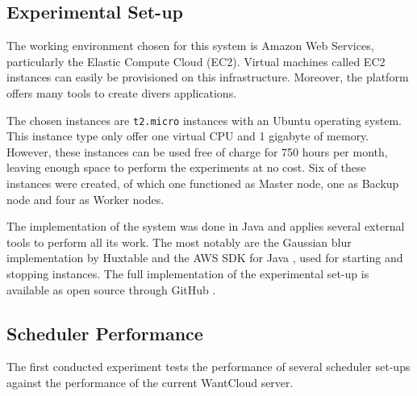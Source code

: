 \documentclass{acm_proc_article-sp}
\begin{document}
\subsection{Experimental Set-up}
The working environment chosen for this system is Amazon Web Services\cite{web:aws}, particularly the Elastic Compute Cloud (EC2)\cite{web:ec2}.
Virtual machines called EC2 instances can easily be provisioned on this infrastructure.
Moreover, the platform offers many tools to create divers applications.

The chosen instances are \texttt{t2.micro} instances with an Ubuntu operating system.
This instance type only offer one virtual CPU and 1 gigabyte of memory.
However, these instances can be used free of charge for 750 hours per month, leaving enough space to perform the experiments at no cost.
Six of these instances were created, of which one functioned as Master node, one as Backup node and four as Worker nodes.

The implementation of the system was done in Java and applies several external tools to perform all its work.
The most notably are the Gaussian blur implementation by Huxtable \cite{web:huxtable} and the AWS SDK for Java \cite{web:sdk}, used for starting and stopping instances.
The full implementation of the experimental set-up is available as open source through GitHub \cite{web:git}.

\subsection{Scheduler Performance}
The first conducted experiment tests the performance of several scheduler set-ups against the performance of the current WantCloud server.
\end{document}
